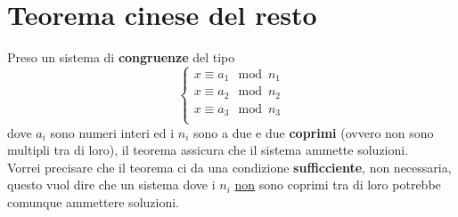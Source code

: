 \section{Teorema cinese del resto}
Preso un sistema di \textbf{congruenze} del tipo
\begin{equation*}
  \begin{cases}
    x \equiv a_1 \mod n_1 \\
    x \equiv a_2 \mod n_2 \\
    x \equiv a_3 \mod n_3 \\
  \end{cases}
\end{equation*}
dove \(a_i\) sono numeri interi ed i \(n_i\) sono a due e due \textbf{coprimi} 
(ovvero non sono multipli tra di loro), il teorema assicura che
il sistema ammette soluzioni. \\
Vorrei precisare che il teorema ci da una condizione \textbf{sufficciente}, non
necessaria, questo vuol dire che un sistema dove i \(n_i\) \underline{non} sono
coprimi tra di loro potrebbe comunque ammettere soluzioni. 